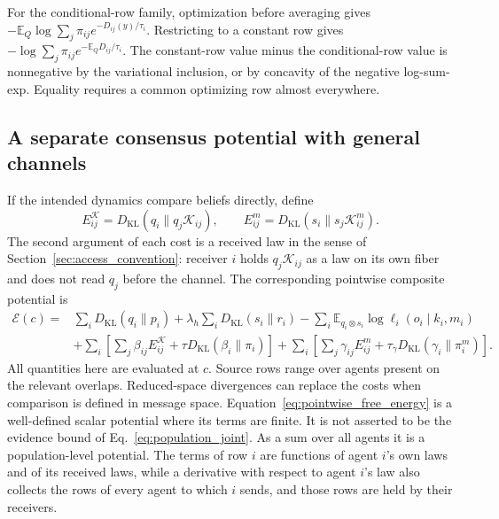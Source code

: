For the conditional-row family, optimization before averaging gives
$-\mathbb E_Q\log\sum_j\pi_{ij}e^{-D_{ij}(y)/\tau_i}$.
Restricting to a constant row gives
$-\log\sum_j\pi_{ij}e^{-\mathbb E_QD_{ij}/\tau_i}$.
The constant-row value minus the conditional-row value is nonnegative by the variational inclusion, or by concavity of the negative log-sum-exp. Equality requires a common optimizing row almost everywhere.

\subsection{A separate consensus potential with general channels}
\label{sec:gauge_transport_arbitrary}
If the intended dynamics compare beliefs directly, define
\begin{equation}
E_{ij}^{\mathcal K}=D_{\mathrm{KL}}(q_i\|q_j\mathcal K_{ij}),\qquad
E_{ij}^{m}=D_{\mathrm{KL}}(s_i\|s_j\mathcal K^m_{ij}).
\label{eq:channel_consensus_cost}
\end{equation}
The second argument of each cost is a received law in the sense of Section~\ref{sec:access_convention}: receiver $i$ holds $q_j\mathcal K_{ij}$ as a law on its own fiber and does not read $q_j$ before the channel. The corresponding pointwise composite potential is
\begin{equation}
\begin{split}
\mathcal E(c)={}&\sum_iD_{\mathrm{KL}}(q_i\|p_i)
+\lambda_h\sum_iD_{\mathrm{KL}}(s_i\|r_i)
-\sum_i\mathbb E_{q_i\otimes s_i}\log\ell_i(o_i\mid k_i,m_i)\\
&+\sum_i\left[\sum_j\beta_{ij}E_{ij}^{\mathcal K}
+\tau D_{\mathrm{KL}}(\beta_i\|\pi_i)\right]
+\sum_i\left[\sum_j\gamma_{ij}E_{ij}^{m}
+\tau_\gamma D_{\mathrm{KL}}(\gamma_i\|\pi_i^m)\right].
\end{split}
\label{eq:pointwise_free_energy}
\end{equation}
All quantities here are evaluated at $c$. Source rows range over agents present on the relevant overlaps. Reduced-space divergences can replace the costs when comparison is defined in message space. Equation~\eqref{eq:pointwise_free_energy} is a well-defined scalar potential where its terms are finite. It is not asserted to be the evidence bound of Eq.~\eqref{eq:population_joint}. As a sum over all agents it is a population-level potential. The terms of row $i$ are functions of agent $i$'s own laws and of its received laws, while a derivative with respect to agent $i$'s law also collects the rows of every agent to which $i$ sends, and those rows are held by their receivers.

